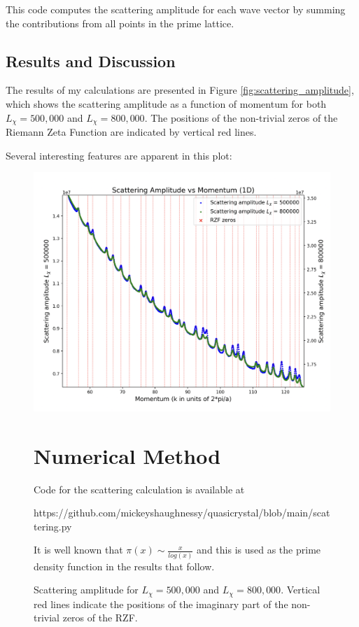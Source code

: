 \documentclass[11pt, oneside]{article}
\begin{document}
This code computes the scattering amplitude for each wave vector by summing the contributions from all points in the prime lattice.

\subsection{Results and Discussion}

The results of my calculations are presented in Figure \ref{fig:scattering_amplitude}, which shows the scattering amplitude as a function of momentum for both $L_\chi = 500,000$ and $L_\chi = 800,000$. The positions of the non-trivial zeros of the Riemann Zeta Function are indicated by vertical red lines.

Several interesting features are apparent in this plot:

\begin{figure}[htbp]
\begin{center}
    \includegraphics[width=0.8\linewidth]{../images/zoomed_scattering.png}
\caption{Scattering amplitude for $L_\chi = 500,000$ and $L_\chi = 800,000$. Vertical red lines indicate the positions of the imaginary part of the non-trivial zeros of the RZF.}

\section{Numerical Method}

 Code for the scattering calculation is available at 
 
 https://github.com/mickeyshaughnessy/quasicrystal/blob/main/scattering.py
 
It is well known that $\pi(x) \sim \frac{x}{log(x)}$ and this is used as the prime density function in the results that follow.
 

\end{center}
\end{figure}
\end{document}

